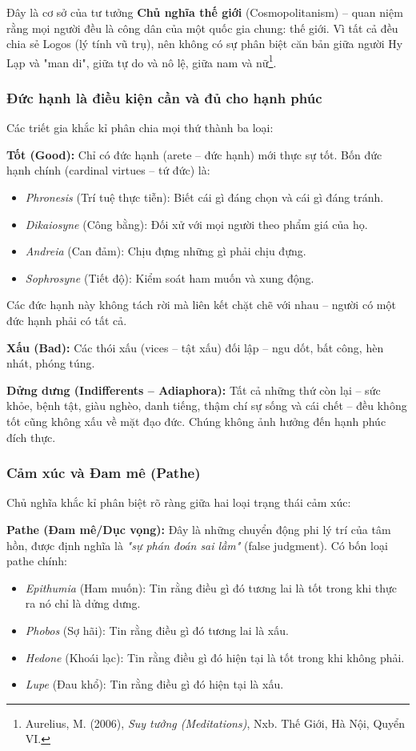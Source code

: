 Đây là cơ sở của tư tưởng \textbf{Chủ nghĩa thế giới} (Cosmopolitanism) – quan niệm rằng mọi người đều là công dân của một quốc gia chung: thế giới. Vì tất cả đều chia sẻ Logos (lý tính vũ trụ), nên không có sự phân biệt căn bản giữa người Hy Lạp và "man di", giữa tự do và nô lệ, giữa nam và nữ\footnote{Aurelius, M. (2006), \textit{Suy tưởng (Meditations)}, Nxb. Thế Giới, Hà Nội, Quyển VI.}.

\subsubsection{Đức hạnh là điều kiện cần và đủ cho hạnh phúc}

Các triết gia khắc kỉ phân chia mọi thứ thành ba loại:

\textbf{Tốt (Good):} Chỉ có đức hạnh (arete – đức hạnh) mới thực sự tốt. Bốn đức hạnh chính (cardinal virtues – tứ đức) là:
\begin{itemize}[leftmargin=1.5cm]
    \item \textit{Phronesis} (Trí tuệ thực tiễn): Biết cái gì đáng chọn và cái gì đáng tránh.
    \item \textit{Dikaiosyne} (Công bằng): Đối xử với mọi người theo phẩm giá của họ.
    \item \textit{Andreia} (Can đảm): Chịu đựng những gì phải chịu đựng.
    \item \textit{Sophrosyne} (Tiết độ): Kiểm soát ham muốn và xung động.
\end{itemize}
Các đức hạnh này không tách rời mà liên kết chặt chẽ với nhau – người có một đức hạnh phải có tất cả.

\textbf{Xấu (Bad):} Các thói xấu (vices – tật xấu) đối lập – ngu dốt, bất công, hèn nhát, phóng túng.

\textbf{Dửng dưng (Indifferents – Adiaphora):} Tất cả những thứ còn lại – sức khỏe, bệnh tật, giàu nghèo, danh tiếng, thậm chí sự sống và cái chết – đều không tốt cũng không xấu về mặt đạo đức. Chúng không ảnh hưởng đến hạnh phúc đích thực.

\subsubsection{Cảm xúc và Đam mê (Pathe)}

Chủ nghĩa khắc kỉ phân biệt rõ ràng giữa hai loại trạng thái cảm xúc:

\textbf{Pathe (Đam mê/Dục vọng):} Đây là những chuyển động phi lý trí của tâm hồn, được định nghĩa là \textit{"sự phán đoán sai lầm"} (false judgment). Có bốn loại pathe chính:
\begin{itemize}[leftmargin=1.5cm]
    \item \textit{Epithumia} (Ham muốn): Tin rằng điều gì đó tương lai là tốt trong khi thực ra nó chỉ là dửng dưng.
    \item \textit{Phobos} (Sợ hãi): Tin rằng điều gì đó tương lai là xấu.
    \item \textit{Hedone} (Khoái lạc): Tin rằng điều gì đó hiện tại là tốt trong khi không phải.
    \item \textit{Lupe} (Đau khổ): Tin rằng điều gì đó hiện tại là xấu.
\end{itemize}

